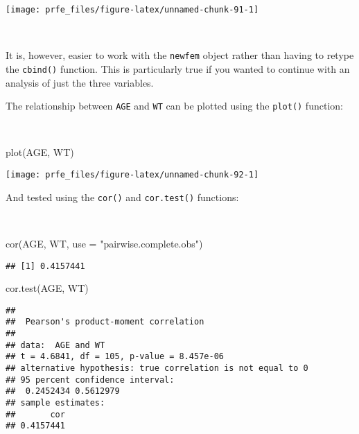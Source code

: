 \documentclass[
  12pt,
  a4paper]{book}
\newenvironment{Shaded}{\begin{snugshade}}{\end{snugshade}}
\newcommand{\AttributeTok}[1]{\textcolor[rgb]{0.77,0.63,0.00}{#1}}
\newcommand{\FunctionTok}[1]{\textcolor[rgb]{0.00,0.00,0.00}{#1}}
\newcommand{\NormalTok}[1]{#1}
\newcommand{\StringTok}[1]{\textcolor[rgb]{0.31,0.60,0.02}{#1}}
\begin{document}
\newpage

\begin{center}\texttt{[image: prfe\_files/figure-latex/unnamed-chunk-91-1]} \end{center}

~

It is, however, easier to work with the \texttt{newfem} object rather than having to retype the \texttt{cbind()} function. This is particularly true if you wanted to continue with an analysis of just the three variables.

The relationship between \texttt{AGE} and \texttt{WT} can be plotted using the \texttt{plot()} function:

~

\begin{Shaded}
\begin{Highlighting}[]
\FunctionTok{plot}\NormalTok{(AGE, WT)}
\end{Highlighting}
\end{Shaded}

\begin{center}\texttt{[image: prfe\_files/figure-latex/unnamed-chunk-92-1]} \end{center}

\newpage

And tested using the \texttt{cor()} and \texttt{cor.test()} functions:

~

\begin{Shaded}
\begin{Highlighting}[]
\FunctionTok{cor}\NormalTok{(AGE, WT, }\AttributeTok{use =} \StringTok{"pairwise.complete.obs"}\NormalTok{)}
\end{Highlighting}
\end{Shaded}

\begin{verbatim}
## [1] 0.4157441
\end{verbatim}

\begin{Shaded}
\begin{Highlighting}[]
\FunctionTok{cor.test}\NormalTok{(AGE, WT)}
\end{Highlighting}
\end{Shaded}

\begin{verbatim}
## 
##  Pearson's product-moment correlation
## 
## data:  AGE and WT
## t = 4.6841, df = 105, p-value = 8.457e-06
## alternative hypothesis: true correlation is not equal to 0
## 95 percent confidence interval:
##  0.2452434 0.5612979
## sample estimates:
##       cor 
## 0.4157441
\end{verbatim}
\end{document}
